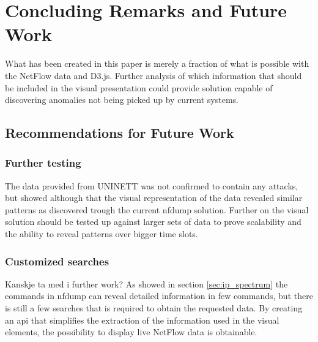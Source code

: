 \chapter{Concluding Remarks and Future Work}
\label{chp:furtherwork}
What has been created in this paper is merely a fraction of what is possible with the NetFlow data and D3.js. Further analysis of which information that should be included in the visual presentation could provide solution capable of discovering anomalies not being picked up by current systems. 

\section{Recommendations for Future Work}
\subsection{Further testing}
The data provided from UNINETT was not confirmed to contain any attacks, but showed although that the visual representation of the data revealed similar patterns as discovered trough the current nfdump solution.  Further on the visual solution should be tested up against larger sets of data to prove scalability and the ability to reveal patterns over bigger time slots. 

\subsection{Customized searches}
Kanskje ta med i further work?
As showed in section \ref{sec:ip_spectrum} the commands in nfdump can reveal detailed information in few commands, but there is still a few searches that is required to obtain the requested data. By creating an \gls{api} that simplifies the extraction of the information used in the visual elements, the possibility to display live NetFlow data is obtainable. 
